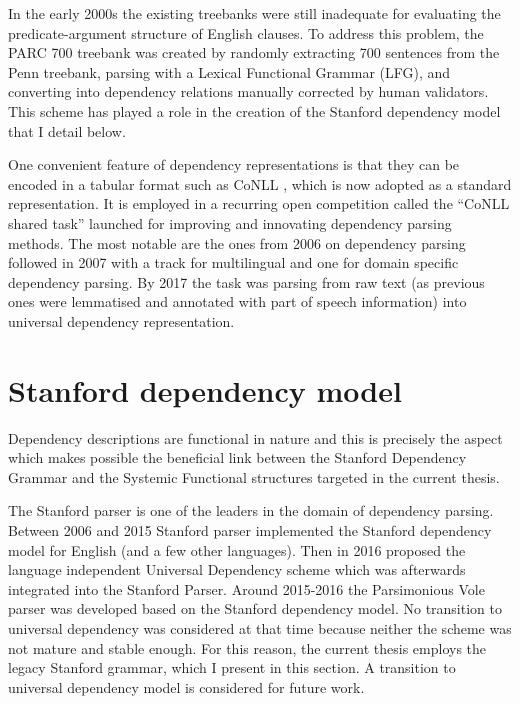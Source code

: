     In the early 2000s the existing treebanks were still inadequate for evaluating the predicate-argument structure of English clauses. To address this problem, the PARC 700 treebank \citep{King2003} was created by randomly extracting 700 sentences from the Penn treebank, parsing with a Lexical Functional Grammar (LFG), and converting into dependency relations manually corrected by human validators. This scheme has played a role in the creation of the Stanford dependency model that I detail below. 

    One convenient feature of dependency representations is that they can be encoded in a tabular format such as CoNLL \citep{nivre2007conll}, which is now adopted as a standard representation. It is employed in a recurring open competition called the ``CoNLL shared task'' launched for improving and innovating dependency parsing methods. The most notable are the ones from 2006 on dependency parsing \citep{Buchholz2006} followed in 2007 with a track for multilingual and one for domain specific dependency parsing. By 2017 \citep{zeman2017conll} the task was parsing from raw text (as previous ones were lemmatised and annotated with part of speech information) into universal dependency representation.

\section{Stanford dependency model}
\label{sec:stanford-dependecy-grammar}

    Dependency descriptions are functional in nature and this is precisely the aspect which makes possible the beneficial link between the Stanford Dependency Grammar and the Systemic Functional structures targeted in the current thesis. 

    The Stanford parser is one of the leaders in the domain of dependency parsing. Between 2006 and 2015 Stanford parser \citep{Marneffe2006} implemented the Stanford dependency model for English (and a few other languages). Then in 2016 \citet{Nivre2016ud} proposed the language independent Universal Dependency scheme which was afterwards integrated into the Stanford Parser. Around 2015-2016 the Parsimonious Vole parser was developed based on the Stanford dependency model. No transition to universal dependency was considered at that time because neither the scheme was not mature and stable enough. For this reason, the current thesis employs the legacy Stanford grammar, which I present in this section. A transition to universal dependency model is considered for future work.

